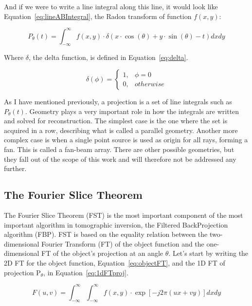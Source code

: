 And if we were to write a line integral along this line, it would look
like Equation~\ref{eq:lineABIntegral}, the Radon transform of function
$f(x, y)$:

\begin{equation}
    \label{eq:lineABIntegral}
    P_{\theta}(t) = \int_{-\infty}^{\infty} f(x, y) \cdot \delta(x \cdot
    \cos(\theta) + y \cdot \sin(\theta) - t) dxdy
\end{equation}

Where $\delta$, the delta function, is defined in
Equation~\ref{eq:delta}.

\begin{equation}
    \label{eq:delta}
    \delta (\phi) =  
    \begin{cases}
            1, & \phi = 0\\
            0, & otherwise
    \end{cases}
\end{equation}

As I have mentioned previously, a projection is a set of line integrals
such as $P_{\theta}(t)$. Geometry plays a very important role in how the
integrals are written and solved for reconstruction. The simplest case
is the one where the set is acquired in a row, describing what is called
a parallel geometry. Another more complex case is when a single point
source is used as origin for all rays, forming a fan. This is called a
fan-beam array. There are other possible geometries, but they fall out of
the scope of this work and will therefore not be addressed any further.

\subsection{The Fourier Slice Theorem}%
\label{sub:the_fourier_slice_theorem}

The Fourier Slice Theorem (\gls{FST}) is the most important component of
the most important algorithm in tomographic inversion, the Filtered
BackProjection algorithm (\gls{FBP}). \gls{FST} is based on the equality
relation between the 
two-dimensional Fourier Transform (\gls{FT}) of the object function and
the one-dimensional \gls{FT} of the object's projection at an angle
$\theta$. Let's start by writing the 2D \gls{FT} for the object
function, Equation~\ref{eq:objectFT}, and the 1D \gls{FT} of projection
P$_\theta$, in Equation~\ref{eq:1dFTproj}.

\begin{equation}
    \label{eq:objectFT}
    F(u, v) = \int_{-\infty}^{\infty} \int_{-\infty}^{\infty} f(x, y)
    \cdot \exp \left [ -j2\pi (ux + vy) \right ] dx dy 
\end{equation}

